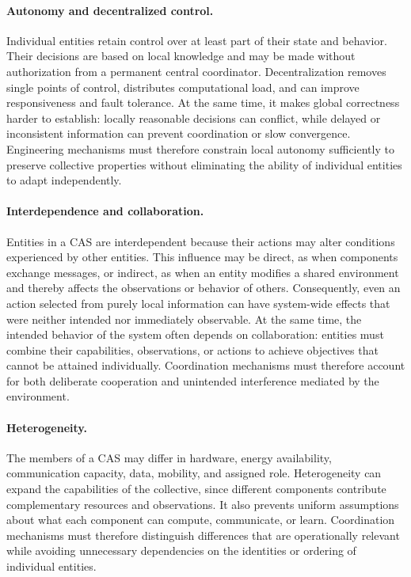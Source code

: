 \paragraph{Autonomy and decentralized control.}
Individual entities retain control over at least part of their state and
 behavior.
%
Their decisions are based on local knowledge and may be made without
 authorization from a permanent central coordinator.
%
Decentralization removes single points of control, distributes computational
 load, and can improve responsiveness and fault tolerance.
%
At the same time, it makes global correctness harder to establish:
 locally reasonable decisions can conflict, while delayed or inconsistent
 information can prevent coordination or slow convergence.
%
Engineering mechanisms must therefore constrain local autonomy sufficiently
 to preserve collective properties without eliminating the ability of
 individual entities to adapt independently.

\paragraph{Interdependence and collaboration.}
Entities in a \gls{CAS} are interdependent because their actions may alter
 conditions experienced by other entities.
%
This influence may be direct, as when components exchange messages, or
 indirect, as when an entity modifies a shared environment and thereby affects
 the observations or behavior of others.
%
Consequently, even an action selected from purely local information can have
 system-wide effects that were neither intended nor immediately observable.
%
At the same time, the intended behavior of the system often depends on
 collaboration: entities must combine their capabilities, observations, or
 actions to achieve objectives that cannot be attained individually.
%
Coordination mechanisms must therefore account for both deliberate cooperation
 and unintended interference mediated by the environment.

\paragraph{Heterogeneity.}
The members of a \gls{CAS} may differ in hardware, energy availability,
 communication capacity, data, mobility, and assigned role.
%
Heterogeneity can expand the capabilities of the collective, since different
 components contribute complementary resources and observations.
%
It also prevents uniform assumptions about what each component can compute,
 communicate, or learn.
%
Coordination mechanisms must therefore distinguish differences that are
 operationally relevant while avoiding unnecessary dependencies on the
 identities or ordering of individual entities.

